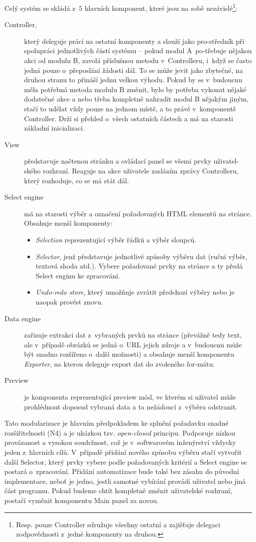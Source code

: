 \documentclass[thesis=B,czech]{FITthesis}[2012/06/26]
\begin{document}
Celý systém se skládá z~5 hlavních komponent, které jsou na sobě nezávislé\footnote{Resp. pouze Controller sdružuje všechny ostatní a zajišťuje delegaci zodpovědnosti z~jedné komponenty na druhou.}:
\begin{description}
	\item [Controller,] který deleguje práci na ostatní komponenty a slouží jako pro-středník při spolupráci jednotlivých částí systému -- pokud modul A~po-třebuje nějakou akci od modulu B, zavolá příslušnou metodu v~Controlleru, i~když se často jedná pouze o~přeposlání žádosti dál. To se může jevit jako zbytečné, na druhou stranu to přináší jednu velkou výhodu. Pokud by se v~budoucnu měla potřebná metoda modulu B změnit, bylo by potřeba vykonat nějaké dodatečné akce a nebo třeba kompletně nahradit modul B nějakým jiným, stačí to udělat vždy pouze na jednom místě, a to právě v~komponentě Controller. Drží si přehled o~všech ostatních částech a má na starosti základní inicializaci.
	\item [View] představuje načtenou stránku a ovládací panel se všemi prvky uživatel-ského rozhraní. Reaguje na akce uživatele zasláním zprávy Controlleru, který rozhoduje, co se má stát dál.
	\item [Select engine] má na starosti výběr a označení požadovaných HTML elementů na stránce. Obsahuje menší komponenty:
	\begin{itemize}
		\item \emph{Selection} reprezentující výběr řádků a výběr sloupců.
		\item \emph{Selector}, jenž představuje jednotlivé způsoby výběru dat (ruční výběr, textová shoda atd.). Vybere požadované prvky na stránce a ty předá Select enginu ke zpracování.
		\item \emph{Undo-redo store}, který umožňuje zvrátit předchozí výběry nebo je naopak provést znovu.
	\end{itemize}
	\item [Data engine] zařizuje extrakci dat z~vybraných prvků na stránce (převážně tedy text, ale v~případě obrázků se jedná o~URL jejich zdroje a v~budoucnu může být snadno rozšířeno o~další možnosti) a obsahuje menší komponentu \emph{Exporter}, na kterou deleguje export dat do zvoleného for-mátu.
	\item [Preview] je komponenta reprezentující preview mód, ve kterém si uživatel může prohlédnout doposud vybraná data a ta nežádoucí z~výběru odstranit.
\end{description}
Tato modularizace je hlavním předpokladem ke splnění požadavku snadné rozšiřitelnosti (N4) a je ukázkou tzv. \emph{open-closed} principu. Podporuje nízkou provázanost a vysokou soudržnost, což je v~softwarovém inženýrství vždycky jeden z~hlavních cílů. V~případě přidání nového způsobu výběru stačí vytvořit další Selector, který prvky vybere podle požadovaných kritérií a Select engine se postará o~zpracování. Přidání automatizace bude také bez zásahu do původní implementace, neboť je jedno, jestli samotné vybírání provádí uživatel nebo jiná část programu. Pokud budeme chtít kompletně změnit uživatelské rozhraní, postačí vyměnit komponentu Main panel za novou.
\end{document}
